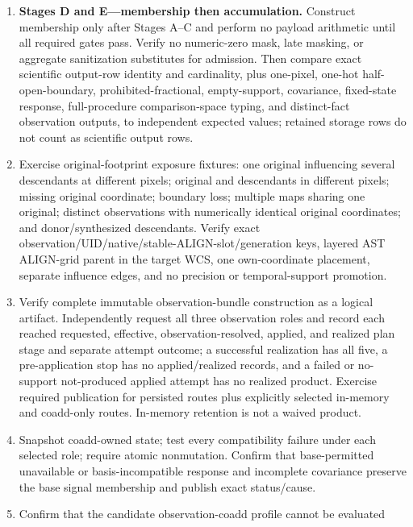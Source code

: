 \documentclass[10pt]{article}
\begin{document}
\begin{enumerate}
four-axis state, causes, and realization before MAP admission. Only
requested/applicable/eligible/realized passes. Verify separately that the PTC
coefficient/QC pass uses its exact PTC-owned profile and neither replaces nor
rescues \SCIMapUpstreamProfile.
\item \textbf{Stages D and E---membership then accumulation.} Construct
membership only after Stages A--C and perform no payload arithmetic until all
required gates pass. Verify no numeric-zero mask, late masking, or aggregate
sanitization substitutes for admission. Then compare exact scientific
output-row identity and cardinality, plus
one-pixel, one-hot half-open-boundary, prohibited-fractional, empty-support,
covariance,
fixed-state response, full-procedure comparison-space typing, and distinct-fact
observation outputs, to independent expected values; retained storage rows do
not count as scientific output rows.
\item Exercise original-footprint exposure fixtures: one original influencing
several descendants at different pixels; original and descendants in
different pixels; missing original coordinate; boundary loss; multiple maps
sharing one original; distinct observations with numerically identical
original coordinates; and donor/synthesized descendants. Verify exact
observation/UID/native/stable-ALIGN-slot/generation keys, layered AST
ALIGN-grid parent in the target WCS, one own-coordinate placement, separate
influence edges, and no precision or temporal-support promotion.
\item Verify complete immutable observation-bundle construction as a logical
artifact. Independently request all three observation roles and record each
reached requested, effective, observation-resolved, applied, and realized plan
stage and separate attempt outcome; a successful realization has all five, a
pre-application stop has no applied/realized records, and a failed or
no-support not-produced applied attempt has no realized product. Exercise
required publication for persisted routes plus explicitly selected in-memory
and coadd-only routes.  In-memory retention is not a waived product.
\item Snapshot coadd-owned state; test every compatibility failure under each
selected role; require atomic nonmutation. Confirm that base-permitted
unavailable or basis-incompatible response and incomplete covariance preserve
the base signal membership and publish exact status/cause.
\item Confirm that the candidate observation-coadd profile cannot be evaluated

\end{enumerate}
\end{document}
